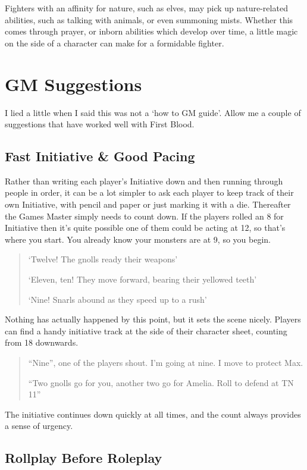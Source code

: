 Fighters with an affinity for nature, such as elves, may pick up nature-related abilities, such as talking with animals, or even summoning mists.  Whether this comes through prayer, or inborn abilities which develop over time, a little magic on the side of a character can make for a formidable fighter.


\section{GM Suggestions}
I lied a little when I said this was not a `how to GM guide'.  Allow me a couple of suggestions that have worked well with First Blood.

\subsection{Fast Initiative \& Good Pacing}

Rather than writing each player's Initiative down and then running through people in order, it can be a lot simpler to ask each player to keep track of their own Initiative, with pencil and paper or just marking it with a die. Thereafter the Games Master simply needs to count down. If the players rolled an 8 for Initiative then it's quite possible one of them could be acting at 12, so that's where you start. You already know your monsters are at 9, so you begin.

\begin{quote}
`Twelve! The gnolls ready their weapons'

`Eleven, ten! They move forward, bearing their yellowed teeth'

`Nine! Snarls abound as they speed up to a rush'
\end{quote}

Nothing has actually happened by this point, but it sets the scene nicely.  Players can find a handy initiative track at the side of their character sheet, counting from 18 downwards.

\begin{quote}
``Nine'', one of the players shout.  I'm going at nine.  I move to protect Max.

``Two gnolls go for you, another two go for Amelia.  Roll to defend at TN 11''

\end{quote}

The initiative continues down quickly at all times, and the count always provides a sense of urgency.

\subsection{Rollplay Before Roleplay}


